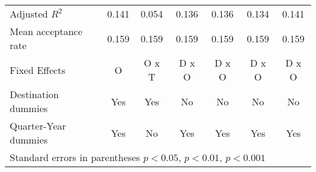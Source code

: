 \begin{table}[!ht]
\begin{tabular}{l*{6}{c}}
Adjusted \(R^{2}\)  &       0.141         &       0.054         &       0.136         &       0.136         &       0.134         &       0.141         \\
Mean acceptance rate&       0.159         &       0.159         &       0.159         &       0.159         &       0.159         &       0.159         \\
Fixed Effects       &           O         &       O x T         &       D x O         &       D x O         &       D x O         &       D x O         \\
Destination dummies &         Yes         &         Yes         &          No         &          No         &          No         &          No         \\
Quarter-Year dummies&         Yes         &          No         &         Yes         &         Yes         &         Yes         &         Yes         \\
\hline\hline
\multicolumn{7}{l}{ Standard errors in parentheses \sym{*} \(p<0.05\), \sym{**} \(p<0.01\), \sym{***} \(p<0.001\)}\\
\end{tabular}
\end{table}
